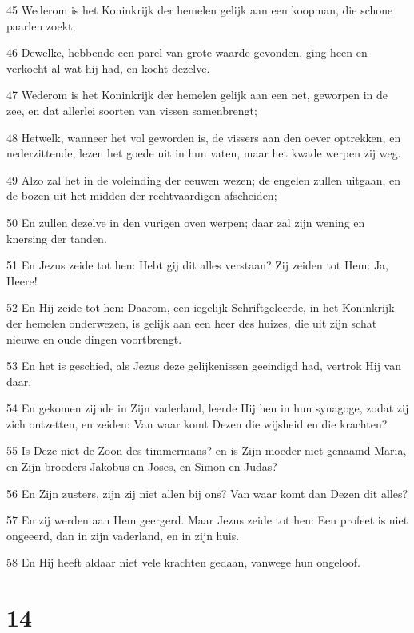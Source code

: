 \par 45 Wederom is het Koninkrijk der hemelen gelijk aan een koopman, die schone paarlen zoekt;
\par 46 Dewelke, hebbende een parel van grote waarde gevonden, ging heen en verkocht al wat hij had, en kocht dezelve.
\par 47 Wederom is het Koninkrijk der hemelen gelijk aan een net, geworpen in de zee, en dat allerlei soorten van vissen samenbrengt;
\par 48 Hetwelk, wanneer het vol geworden is, de vissers aan den oever optrekken, en nederzittende, lezen het goede uit in hun vaten, maar het kwade werpen zij weg.
\par 49 Alzo zal het in de voleinding der eeuwen wezen; de engelen zullen uitgaan, en de bozen uit het midden der rechtvaardigen afscheiden;
\par 50 En zullen dezelve in den vurigen oven werpen; daar zal zijn wening en knersing der tanden.
\par 51 En Jezus zeide tot hen: Hebt gij dit alles verstaan? Zij zeiden tot Hem: Ja, Heere!
\par 52 En Hij zeide tot hen: Daarom, een iegelijk Schriftgeleerde, in het Koninkrijk der hemelen onderwezen, is gelijk aan een heer des huizes, die uit zijn schat nieuwe en oude dingen voortbrengt.
\par 53 En het is geschied, als Jezus deze gelijkenissen geeindigd had, vertrok Hij van daar.
\par 54 En gekomen zijnde in Zijn vaderland, leerde Hij hen in hun synagoge, zodat zij zich ontzetten, en zeiden: Van waar komt Dezen die wijsheid en die krachten?
\par 55 Is Deze niet de Zoon des timmermans? en is Zijn moeder niet genaamd Maria, en Zijn broeders Jakobus en Joses, en Simon en Judas?
\par 56 En Zijn zusters, zijn zij niet allen bij ons? Van waar komt dan Dezen dit alles?
\par 57 En zij werden aan Hem geergerd. Maar Jezus zeide tot hen: Een profeet is niet ongeeerd, dan in zijn vaderland, en in zijn huis.
\par 58 En Hij heeft aldaar niet vele krachten gedaan, vanwege hun ongeloof.

\chapter{14}

